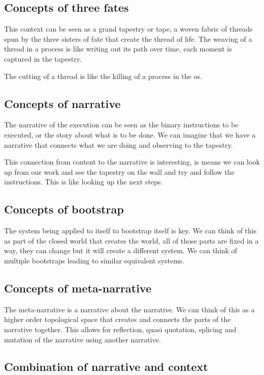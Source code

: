 \documentclass{article}
\begin{document}
\subsection{Concepts of three fates}

This context can be seen as a grand tapestry or tape, a woven fabric of threads
spun by the three sisters of fate that create the thread of life.
The weaving of a thread in a process is like writing out its path over time, each moment is captured in the tapestry.

The cutting of a thread is like the killing of a process in the os. 

\subsection{Concepts of narrative}

The narrative of the execution can be seen as the binary instructions to be executed, or the story about what is to be done. We can imagine that
we have a narrative that connects what we are doing and observing
to the tapestry. 

This connection from content to the narrative is interesting,
is means we can look up from our work and see the tapestry on the wall and try and follow the instructions. This is like looking up the next steps.

\subsection{Concepts of bootstrap}

The system being applied to itself to bootstrap itself is key.
We can think of this as part of the closed world that creates the world,
all of those parts are fixed in a way, they can change but it will create a different system. We can think of multiple bootstraps leading to similar equivalent systems.

\subsection{Concepts of meta-narrative}

The meta-narrative is a narrative about the narrative. We can think of this as a higher order topological space that creates and connects the parts of the narrative together. This allows for reflection, quasi quotation, splicing and mutation of the narrative using another narrative. 

\subsection{Combination of narrative and context}
\end{document}
